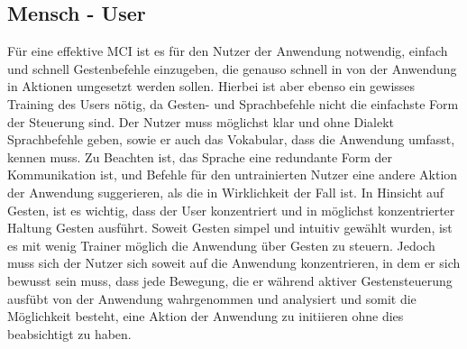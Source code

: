 \subsection{Mensch - User}
F\"ur eine effektive \gls{MCI} ist es f\"ur den Nutzer der Anwendung notwendig, einfach und schnell Gestenbefehle einzugeben, die genauso schnell in von der Anwendung in Aktionen umgesetzt werden sollen. Hierbei ist aber ebenso ein gewisses Training des Users n\"otig, da Gesten- und Sprachbefehle nicht die einfachste Form der Steuerung sind. Der Nutzer muss m\"oglichst klar und ohne Dialekt Sprachbefehle geben, sowie er auch das Vokabular, dass die Anwendung umfasst, kennen muss.
\newline
Zu Beachten ist, das Sprache eine redundante Form der Kommunikation ist, und Befehle f\"ur den untrainierten Nutzer eine andere Aktion der Anwendung suggerieren, als die in Wirklichkeit der Fall ist.
\newline
In Hinsicht auf Gesten, ist es wichtig, dass der User konzentriert und in m\"oglichst konzentrierter Haltung Gesten ausf\"uhrt. Soweit Gesten simpel und intuitiv gew\"ahlt wurden, ist es mit wenig Trainer m\"oglich die Anwendung \"uber Gesten zu steuern. Jedoch muss sich der Nutzer sich soweit auf die Anwendung konzentrieren, in dem er sich bewusst sein muss, dass jede Bewegung, die er w\"ahrend aktiver Gestensteuerung ausf\"ubt von der Anwendung wahrgenommen und analysiert und somit die M\"oglichkeit besteht, eine Aktion der Anwendung zu initiieren ohne dies beabsichtigt zu haben.

